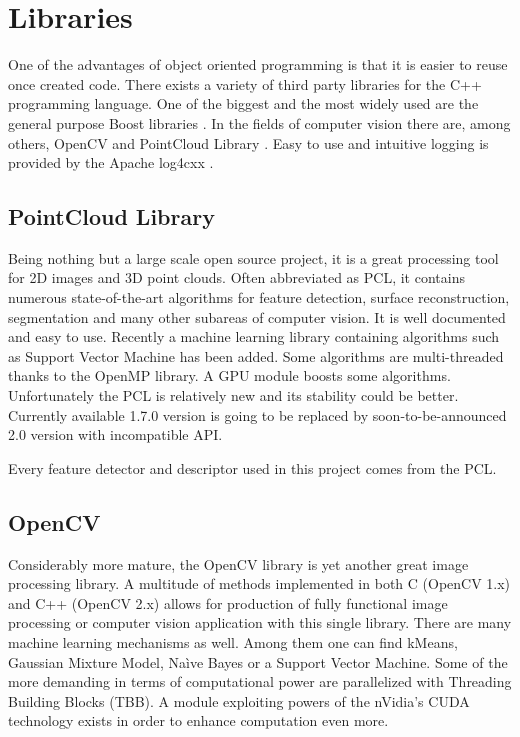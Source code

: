 \section{Libraries}

	One of the advantages of object oriented programming is that it is easier to reuse once created code. There exists a variety of third party libraries for the C++ programming language. One of the biggest and the most widely used are the general purpose Boost libraries \cite{Boost}. In the fields of computer vision there are, among others, OpenCV \cite{OpenCV} and PointCloud Library \cite{PCL}. Easy to use and intuitive logging is provided by the Apache log4cxx \cite{log4cxx}.
	
	\subsection{PointCloud Library}
	Being nothing but a large scale open source project, it is a great processing tool for 2D images and 3D point clouds. Often abbreviated as PCL, it contains numerous state-of-the-art algorithms for feature detection, surface reconstruction, segmentation and many other subareas of computer vision. It is well documented and easy to use. Recently a machine learning library containing algorithms such as Support Vector Machine has been added. Some algorithms are multi-threaded thanks to the OpenMP library. A GPU module boosts some algorithms. Unfortunately the PCL is relatively new and its stability could be better. Currently available 1.7.0 version is going to be replaced by soon-to-be-announced 2.0 version with incompatible API.
	
	Every feature detector and descriptor used in this project comes from the PCL.
	
	\subsection{OpenCV}
	Considerably more mature, the OpenCV library is yet another great image processing library. A multitude of methods implemented in both C (OpenCV 1.x) and C++ (OpenCV 2.x) allows for production of fully functional image processing or computer vision application with this single library. There are many machine learning mechanisms as well. Among them one can find kMeans, Gaussian Mixture Model, Na\`ive Bayes or a Support Vector Machine. Some of the more demanding in terms of computational power are parallelized with Threading Building Blocks (TBB). A module exploiting powers of the nVidia's CUDA technology exists in order to enhance computation even more.
	
